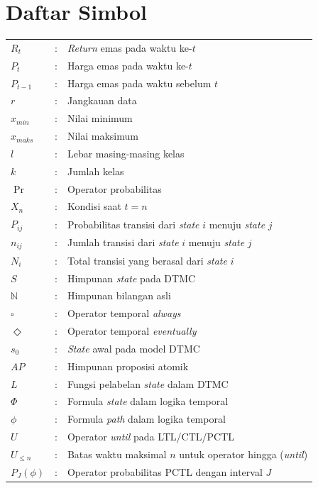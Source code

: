 \chapter*{Daftar Simbol}

\begin{table}[htbp]
    \begin{tabular}{lcl}
         $R_t$      & : & \textit{Return} emas pada waktu ke-$t$ \\[4pt]
        $P_t$       & : & Harga emas pada waktu ke-$t$ \\[4pt]
        $P_{t-1}$   & : & Harga emas pada waktu sebelum $t$ \\[4pt]
        $r$         & : & Jangkauan data \\[4pt]
        $x_{min}$   & : & Nilai minimum \\[4pt]
        $x_{maks}$  & : & Nilai maksimum \\[4pt]
        $l$         & : & Lebar masing-masing kelas \\[4pt]
        $k$         & : & Jumlah kelas \\[4pt]
        $\Pr$       & : & Operator probabilitas \\[4pt]
        $X_n$       & : & Kondisi saat $t = n$ \\[4pt]
        $P_{ij}$    & : & Probabilitas transisi dari \textit{state} $i$ menuju \textit{state} $j$ \\[4pt]
        $n_{ij}$    & : & Jumlah transisi dari \textit{state} $i$ menuju \textit{state} $j$ \\[4pt]
        $N_i$       & : & Total transisi yang berasal dari \textit{state} $i$ \\[4pt]
        $S$         & : & Himpunan \textit{state} pada DTMC \\[4pt]
        $\mathbb{N}$ & : & Himpunan bilangan asli \\[4pt]
        $\square$   & : & Operator temporal \textit{always} \\[4pt]
        $\Diamond$  & : & Operator temporal \textit{eventually} \\[4pt]
        $s_0$       & : & \textit{State} awal pada model DTMC \\[4pt]
        $AP$        & : & Himpunan proposisi atomik \\[4pt]
        $L$         & : & Fungsi pelabelan \textit{state} dalam DTMC \\[4pt]
        $\Phi$      & : & Formula \textit{state} dalam logika temporal \\[4pt]
        $\phi$      & : & Formula \textit{path} dalam logika temporal \\[4pt]
        $U$         & : & Operator \textit{until} pada LTL/CTL/PCTL \\[4pt]
        $U_{\le n}$ & : & Batas waktu maksimal $n$ untuk operator hingga (\textit{until}) \\[4pt]
        $P_J(\phi)$  & : & Operator probabilitas PCTL dengan interval $J$ \\[4pt]
    \end{tabular}
\end{table}